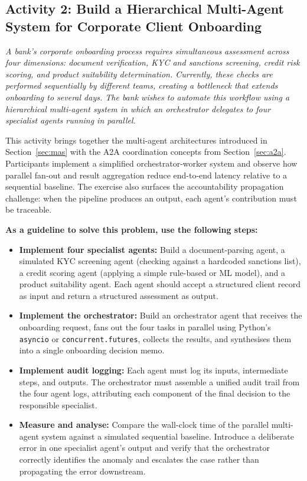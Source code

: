 \documentclass{article}
\begin{document}

\subsection*{Activity 2: Build a Hierarchical Multi-Agent System for Corporate Client Onboarding}
\textit{
A bank's corporate onboarding process requires simultaneous assessment across four dimensions: document verification, KYC and sanctions screening, credit risk scoring, and product suitability determination. Currently, these checks are performed sequentially by different teams, creating a bottleneck that extends onboarding to several days. The bank wishes to automate this workflow using a hierarchical multi-agent system in which an orchestrator delegates to four specialist agents running in parallel.
}

This activity brings together the multi-agent architectures introduced in Section~\ref{sec:mas} with the A2A coordination concepts from Section~\ref{sec:a2a}. Participants implement a simplified orchestrator-worker system and observe how parallel fan-out and result aggregation reduce end-to-end latency relative to a sequential baseline. The exercise also surfaces the accountability propagation challenge: when the pipeline produces an output, each agent's contribution must be traceable.

\textbf{As a guideline to solve this problem, use the following steps:}
\begin{itemize}
    \item \textbf{Implement four specialist agents:} Build a document-parsing agent, a simulated KYC screening agent (checking against a hardcoded sanctions list), a credit scoring agent (applying a simple rule-based or ML model), and a product suitability agent. Each agent should accept a structured client record as input and return a structured assessment as output.
    \item \textbf{Implement the orchestrator:} Build an orchestrator agent that receives the onboarding request, fans out the four tasks in parallel using Python's \texttt{asyncio} or \texttt{concurrent.futures}, collects the results, and synthesises them into a single onboarding decision memo.
    \item \textbf{Implement audit logging:} Each agent must log its inputs, intermediate steps, and outputs. The orchestrator must assemble a unified audit trail from the four agent logs, attributing each component of the final decision to the responsible specialist.
    \item \textbf{Measure and analyse:} Compare the wall-clock time of the parallel multi-agent system against a simulated sequential baseline. Introduce a deliberate error in one specialist agent's output and verify that the orchestrator correctly identifies the anomaly and escalates the case rather than propagating the error downstream.
\end{itemize}
\end{document}
